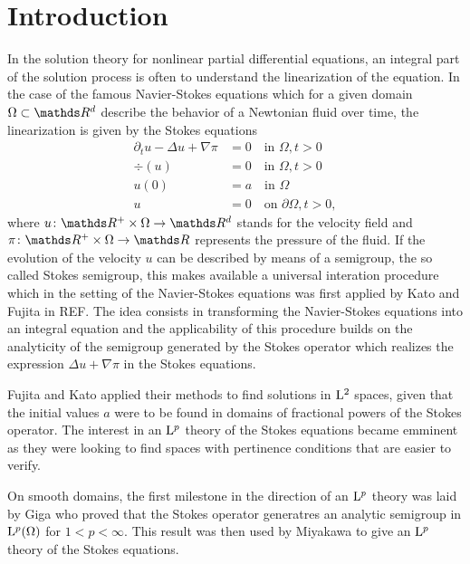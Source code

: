 \chapter*{Introduction}

In the solution theory for nonlinear partial differential equations, an integral part of the solution process is often to understand the linearization of the equation.
In the case of the famous Navier-Stokes equations which for a given domain $\Omega \subset \R^d$ describe the behavior of a Newtonian fluid over time, the linearization is given by the Stokes equations
\begin{align*}
  \partial_t u - \Delta u + \nabla \pi &= 0 \quad\text{in } \Omega, t > 0\\
  \div(u) &= 0 \quad\text{in } \Omega, t > 0 \\
  u(0) &= a \quad\text{in } \Omega \\
  u &= 0 \quad\text{on } \partial\Omega, t > 0,
\end{align*}
where $u \colon \R^+ \times \Omega \to \R^d$ stands for the velocity field and $\pi \colon \R^+ \times \Omega \to \R$ represents the pressure of the fluid.
If the evolution of the velocity $u$ can be described by means of a semigroup, the so called Stokes semigroup, this makes available a universal interation procedure which in the setting of the Navier-Stokes equations was first applied by Kato and Fujita in REF.
The idea consists in transforming the Navier-Stokes equations into an integral equation and the applicability of this procedure builds on the analyticity of the semigroup generated by the Stokes operator which realizes the expression $\Delta u + \nabla \pi$ in the Stokes equations.

Fujita and Kato applied their methods to find solutions in $\mathrm{L}^2$ spaces, given that the initial values $a$ were to be found in domains of fractional powers of the Stokes operator.
The interest in an $\mathrm{L}^p$ theory of the Stokes equations became emminent as they were looking to find spaces with pertinence conditions that are easier to verify.

On smooth domains, the first milestone in the direction of an $\mathrm{L}^p$ theory was laid by Giga who proved that the Stokes operator generatres an analytic semigroup in $\mathrm{L}^p(\Omega)$ for $1 < p < \infty$.
This result was then used by Miyakawa to give an $\mathrm{L}^p$ theory of the Stokes equations.

